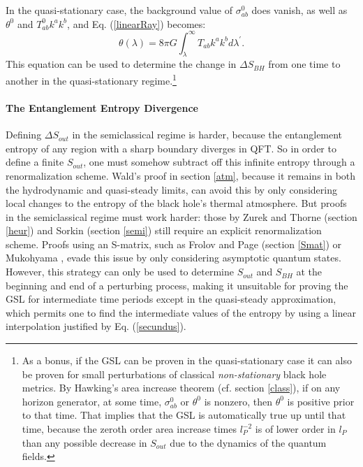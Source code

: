 \documentclass{article}
\begin{document}
In the quasi-stationary case, the background value of $\sigma_{ab}^{0}$ does vanish, as well as $\theta^{0}$ and $T_{ab}^{0} k^a k^b$, and Eq. (\ref{linearRay}) becomes:
\begin{equation}\label{response}
\theta(\lambda) = 8\pi G \int^{\infty}_{\lambda} \!\! T_{ab} k^a k^b d\lambda^{\prime}.
\end{equation}
This equation can be used to determine the change in $\Delta S_{BH}$ from one time to another in the quasi-stationary regime.\footnote{As a bonus, if the GSL can be proven in the quasi-stationary case it can also be proven for small perturbations of classical \emph{non-stationary} black hole metrics.  By Hawking's area increase theorem (cf. section \ref{class}), if on any horizon generator, at some time, $\sigma_{ab}^{0}$ or $\theta^{0}$ is nonzero, then $\theta^{0}$ is positive prior to that time.  That implies that the GSL is automatically true up until that time, because the zeroth order area increase times $l_{P}^{-2}$ is of lower order in $l_{P}$ than any possible decrease in $S_{out}$ due to the dynamics of the quantum fields.}
\paragraph{The Entanglement Entropy Divergence}
Defining $\Delta S_{out}$ in the semiclassical regime is harder, because the entanglement entropy of any region with a sharp boundary diverges in QFT.  So in order to define a finite $S_{out}$, one must somehow subtract off this infinite entropy through a renormalization scheme.  Wald's proof in section \ref{atm}, because it remains in both the hydrodynamic and quasi-steady limits, can avoid this by only considering local changes to the entropy of the black hole's thermal atmosphere.  But proofs in the semiclassical regime must work harder: those by Zurek and Thorne \cite{ZT85} (section \ref{heur}) and Sorkin \cite{sorkin98} (section \ref{semi}) still require an explicit renormalization scheme.  Proofs using an S-matrix, such as Frolov and Page \cite{FP93} (section \ref{Smat}) or Mukohyama \cite{muko97}, evade this issue by only considering asymptotic quantum states.  However, this strategy can only be used to determine $S_{out}$ and $S_{BH}$ at the beginning and end of a perturbing process, making it unsuitable for proving the GSL for intermediate time periods except in the quasi-steady approximation, which permits one to find the intermediate values of the entropy by using a linear interpolation justified by Eq. (\ref{secundus}).
\end{document}
